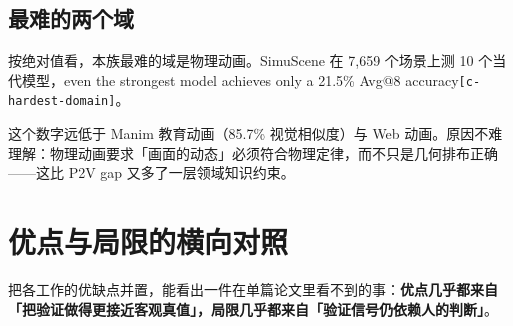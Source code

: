 \subsection{最难的两个域}

按绝对值看，本族最难的域是物理动画。SimuScene 在 7,659 个场景上测 10 个当代模型，even the strongest model achieves only a 21.5\% Avg@8 accuracy{\scriptsize\texttt{[c-\hspace{0pt}hardest-\hspace{0pt}domain]}}。


这个数字远低于 Manim 教育动画（85.7\% 视觉相似度）与 Web 动画。原因不难理解：物理动画要求「画面的动态」必须符合物理定律，而不只是几何排布正确——这比 P2V gap 又多了一层领域知识约束。



\section{优点与局限的横向对照}

把各工作的优缺点并置，能看出一件在单篇论文里看不到的事：\textbf{优点几乎都来自「把验证做得更接近客观真值」，局限几乎都来自「验证信号仍依赖人的判断」}。


